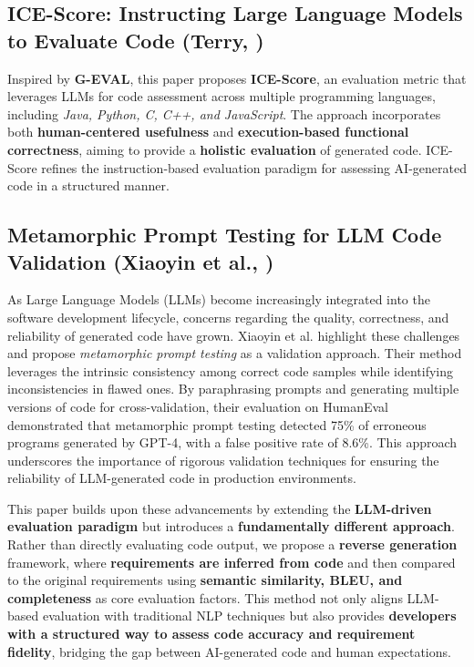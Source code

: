 \documentclass{article}
\begin{document}
\subsection{ICE-Score: Instructing Large Language Models to Evaluate Code (Terry, \cite{terry2024icescore})}

Inspired by \textbf{G-EVAL}, this paper proposes \textbf{ICE-Score}, an evaluation metric that leverages LLMs for code assessment across multiple programming languages, including \textit{Java, Python, C, C++, and JavaScript}. The approach incorporates both \textbf{human-centered usefulness} and \textbf{execution-based functional correctness}, aiming to provide a \textbf{holistic evaluation} of generated code. ICE-Score refines the instruction-based evaluation paradigm for assessing AI-generated code in a structured manner.

\subsection{Metamorphic Prompt Testing for LLM Code Validation (Xiaoyin et al., \cite{wang2024validating} )}

As Large Language Models (LLMs) become increasingly integrated into the software development lifecycle, concerns regarding the quality, correctness, and reliability of generated code have grown. Xiaoyin et al. \cite{wang2024validating} highlight these challenges and propose \textit{metamorphic prompt testing} as a validation approach. Their method leverages the intrinsic consistency among correct code samples while identifying inconsistencies in flawed ones. By paraphrasing prompts and generating multiple versions of code for cross-validation, their evaluation on HumanEval demonstrated that metamorphic prompt testing detected 75\% of erroneous programs generated by GPT-4, with a false positive rate of 8.6\%. This approach underscores the importance of rigorous validation techniques for ensuring the reliability of LLM-generated code in production environments.

This paper builds upon these advancements by extending the \textbf{LLM-driven evaluation paradigm} but introduces a \textbf{fundamentally different approach}. Rather than directly evaluating code output, we propose a \textbf{reverse generation} framework, where \textbf{requirements are inferred from code} and then compared to the original requirements using \textbf{semantic similarity, BLEU, and completeness} as core evaluation factors. This method not only aligns LLM-based evaluation with traditional NLP techniques but also provides \textbf{developers with a structured way to assess code accuracy and requirement fidelity}, bridging the gap between AI-generated code and human expectations.
\end{document}
